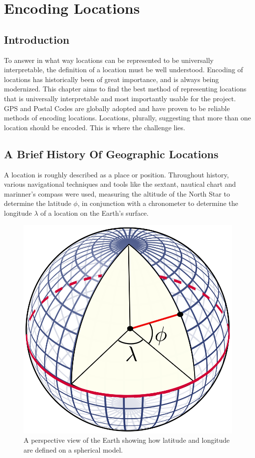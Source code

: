 
\chapter{Encoding Locations}

\ifpdf
  \graphicspath{{Chapter2/Figs/Raster/}{Chapter2/Figs/PDF/}{Chapter2/Figs/}}
\else
  \graphicspath{{Chapter2/Figs/Vector/}{Chapter2/Figs/}}
\fi

\section{Introduction}
To answer in what way locations can be represented to be universally interpretable, the definition of a location must be well understood. Encoding of locations has historically been of great importance, and is always being modernized. This chapter aims to find the best method of representing locations that is universally interpretable and most importantly usable for the project. GPS and Postal Codes are globally adopted and have proven to be reliable methods of encoding locations. Locations, plurally, suggesting that more than one location should be encoded. This is where the challenge lies.

\section{A Brief History Of Geographic Locations}

A location is roughly described as a place or position. Throughout history, various navigational techniques and tools like the sextant, nautical chart and marinner's compass were used, measuring the altitude of the North Star to determine the latitude $\phi$, in conjunction with a chronometer to determine the longitude $\lambda$ of a location on the Earth's surface.

\begin{figure}[htbp!]
  \centering
  \includegraphics[width=.2\textwidth]{LatLngSphere}
  \caption[LatLngSphere]{A perspective view of the Earth showing how latitude and longitude are defined on a spherical model.}
  \label{fig:latlngsphere}
\end{figure}

